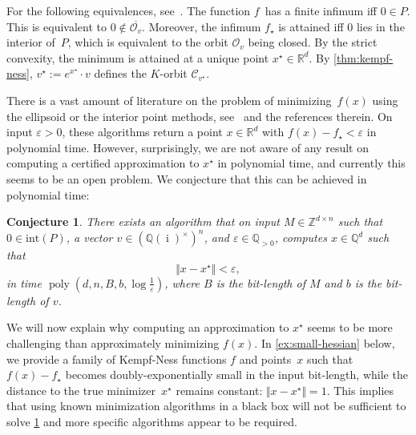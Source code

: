 \documentclass[a4paper,USenglish,cleveref,numberwithinsect]{lipics-v2021}
\newtheorem{openproblem}[theorem]{Conjecture}\crefname{openproblem}{Conjecture}{Conjectures}
\DeclareMathOperator{\poly}{poly}
\DeclareMathOperator{\ii}{i}
\newcommand{\QQ}{\mathbb{Q}}
\newcommand{\ZZ}{\mathbb{Z}}
\newcommand{\RR}{\mathbb{R}}
\newcommand{\OO}{\ensuremath{\mathcal{O}}}
\newcommand{\KK}{\ensuremath{\mathcal{C}}}
\numberwithin{equation}{section}
\begin{document}
For the following equivalences, see~\cite{BLNW:20,torus}.
The function $f$~has a finite infimum iff $0\in P$.
This is equivalent to $0 \not\in\overline{\OO_v}$.
Moreover, the infimum $f_\star$ is attained iff $0$ lies in the interior of~$P$,
which is equivalent to the orbit $\OO_v$ being closed.
By the strict convexity, the minimum is attained at a unique point $x^\star\in\RR^d$.
By \cref{thm:kempf-ness},
$v^\star := e^{x^\star}\cdot v$
defines the $K$-orbit $\KK_{v^\star}$.

There is a vast amount of literature on the problem of minimizing~$f(x)$
using the ellipsoid or the interior point methods,
see~\cite{BLNW:20, geomet-tut,nemirovski-ellipsoid, vishnoi-singh, vishnoi-straszak, leake-vishnoi} and the references therein.
On input $\varepsilon>0$, these algorithms return a point $x\in\RR^d$ with $f(x)-f_\star<\varepsilon$ in polynomial time.
However, surprisingly, we are not aware of any result on computing a certified approximation to $x^\star$ in polynomial time, and currently this seems to be an open problem.
We conjecture that this can be achieved in polynomial time:

\begin{openproblem}
\label{conj:optimal}
	There exists an algorithm that on input $M\in\ZZ^{d\times n}$ such that $0\in\mathrm{int}(P)$, a vector $v\in(\QQ(\ii)^\times)^n$, and $\varepsilon\in\QQ_{>0}$, computes $x\in\QQ^d$ such that \[
	\Vert x-x^\star\Vert < \varepsilon,
	\] in time $\poly(d,n,B,b,\log\frac{1}{\varepsilon})$, where $B$ is the bit-length of $M$ and $b$ is the bit-length of $v$.
\end{openproblem}

We will now explain why computing an approximation to $x^\star$ seems to be more challenging than approximately minimizing $f(x)$.
In \cref{ex:small-hessian} below, we provide a family of Kempf-Ness functions $f$ and points~$x$ such that $f(x)-f_\star$ becomes doubly-exponentially small in the input bit-length, while the distance to the true minimizer~$x^\star$ remains constant: $\Vert x-x^\star\Vert=1$.
This implies that using known minimization algorithms in a black box will not be sufficient to solve \cref{conj:optimal} and more specific algorithms appear to be required.
\end{document}
